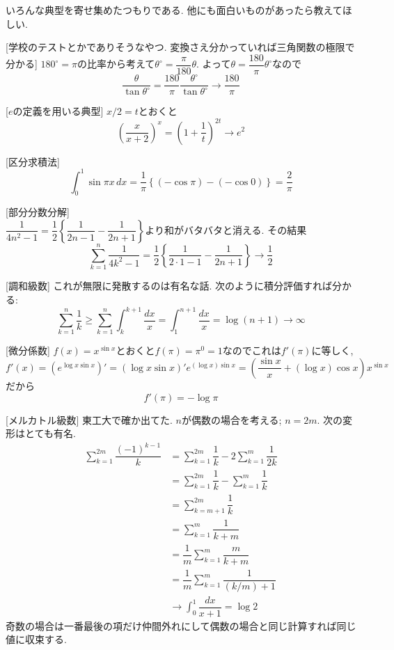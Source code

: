 いろんな典型を寄せ集めたつもりである. 他にも面白いものがあったら教えてほしい. 

 [学校のテストとかでありそうなやつ. 変換さえ分かっていれば三角関数の極限で分かる]  $180^{\circ} = \pi$の比率から考えて$\theta^{\circ} = \dfrac{\pi}{180}\theta$. よって$\theta = \dfrac{180}{\pi}\theta^{\circ}$なので
\[\dfrac{\theta}{\tan{\theta^{\circ}}} = \dfrac{180}{\pi} \dfrac{\theta^{\circ}}{\tan{\theta^{\circ}}} \to \dfrac{180}{\pi}\]

 [$e$の定義を用いる典型]  $x/2 = t$とおくと
\[\left(\dfrac{x}{x+2}\right)^x = (1+\dfrac{1}{t})^{2t} \to e^2\]

 [区分求積法]
\[\int_{0}^{1} \sin{\pi x}\, dx = \dfrac{1}{\pi}\left\{ (-\cos{\pi}) - (-\cos{0})  \right\} = \dfrac{2}{\pi}\]

 [部分分数分解] \\$\dfrac{1}{4n^2 - 1} = \dfrac{1}{2}\left\{ \dfrac{1}{2n-1} - \dfrac{1}{2n+1}\right\}$より和がバタバタと消える. その結果
\[\sum_{k=1}^{n} \dfrac{1}{4k^2-1} = \dfrac{1}{2} \left\{ \dfrac{1}{2\cdot 1-1} - \dfrac{1}{2n + 1}\right\} \to \dfrac{1}{2}\]


 [調和級数] これが無限に発散するのは有名な話. 次のように積分評価すれば分かる:
\[
\sum_{k=1}^{n} \dfrac{1}{k} \geq \sum_{k=1}^{n} \int_{k}^{k+1} \dfrac{dx}{x} = \int_{1}^{n+1} \dfrac{dx}{x} = \log{(n+1)} \to \infty
\] 


 [微分係数] $f(x) = x^{\sin{x}}$とおくと$f(\pi) = \pi^{0} = 1$なのでこれは$f'(\pi)$に等しく, $f'(x) = (e^{\log{x} \sin{x}})' = (\log{x}\sin{x})' e^{(\log{x})\sin{x}} = (\dfrac{\sin{x}}{x} + (\log{x})\cos{x})x^{\sin{x}}$だから
\[f'(\pi) = -\log{\pi} \] 

 [メルカトル級数] 東工大で確か出てた. $n$が偶数の場合を考える; $n=2m$. 次の変形はとても有名. 
\begin{align*}
\sum_{k=1}^{2m} \dfrac{(-1)^{k-1}}{k} &= \sum_{k=1}^{2m} \dfrac{1}{k} - 2\sum_{k=1}^{m} \dfrac{1}{2k} \\
&= \sum_{k=1}^{2m}\dfrac{1}{k} - \sum_{k=1}^{m} \dfrac{1}{k} \\
&= \sum_{k=m+1}^{2m} \dfrac{1}{k} \\
&= \sum_{k=1}^{m} \dfrac{1}{k+m} \\
&= \dfrac{1}{m} \sum_{k=1}^{m} \dfrac{m}{k+m} \\
&= \dfrac{1}{m} \sum_{k=1}^{m} \dfrac{1}{(k/m) + 1}\\
&\to \int_{0}^{1} \dfrac{dx}{x+1} = \log{2}
\end{align*}
奇数の場合は一番最後の項だけ仲間外れにして偶数の場合と同じ計算すれば同じ値に収束する. 


